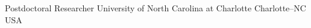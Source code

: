 \documentclass[11pt, letterpaper, sans]{moderncv}
\begin{document}
    {Postdoctoral Researcher}
    {University of North Carolina at Charlotte}
    {Charlotte--NC}
    {USA}
    {}
\end{document}
